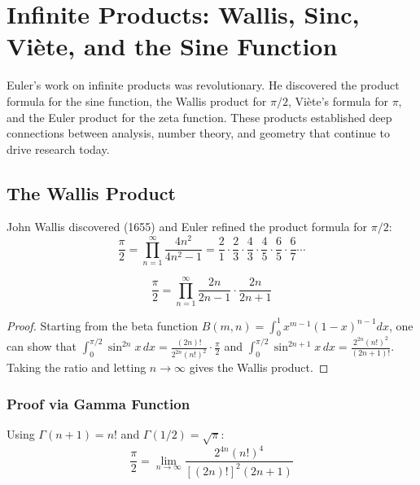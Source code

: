 
\chapter{Infinite Products: Wallis, Sinc, Vi\`{e}te, and the Sine Function}

\begin{historical}
Euler's work on infinite products was revolutionary. He discovered the product formula for
the sine function, the Wallis product for $\pi/2$, Vi\`{e}te's formula for $\pi$, and the Euler
product for the zeta function. These products established deep connections between analysis,
number theory, and geometry that continue to drive research today.
\end{historical}

\section{The Wallis Product}

John Wallis discovered (1655) and Euler refined the product formula for $\pi/2$:
\[
\frac{\pi}{2} = \prod_{n=1}^\infty \frac{4n^2}{4n^2 - 1}
= \frac{2}{1} \cdot \frac{2}{3} \cdot \frac{4}{3} \cdot \frac{4}{5} \cdot \frac{6}{5} \cdot \frac{6}{7} \cdots
\]

\begin{theorem}
\[
\frac{\pi}{2} = \prod_{n=1}^{\infty} \frac{2n}{2n-1} \cdot \frac{2n}{2n+1}
\]
\end{theorem}

\begin{proof}
Starting from the beta function $B(m,n) = \int_0^1 x^{m-1}(1-x)^{n-1} dx$, one can show
that $\int_0^{\pi/2} \sin^{2n} x \, dx = \frac{(2n)!}{2^{2n}(n!)^2} \cdot \frac{\pi}{2}$ and
$\int_0^{\pi/2} \sin^{2n+1} x \, dx = \frac{2^{2n}(n!)^2}{(2n+1)!}$. Taking the ratio and
letting $n \to \infty$ gives the Wallis product.
\end{proof}

\subsection{Proof via Gamma Function}

\begin{theorem}
Using $\Gamma(n+1) = n!$ and $\Gamma(1/2) = \sqrt{\pi}$:
\[
\frac{\pi}{2} = \lim_{n\to\infty} \frac{2^{4n} (n!)^4}{[(2n)!]^2 (2n+1)}
\]
\end{theorem}

